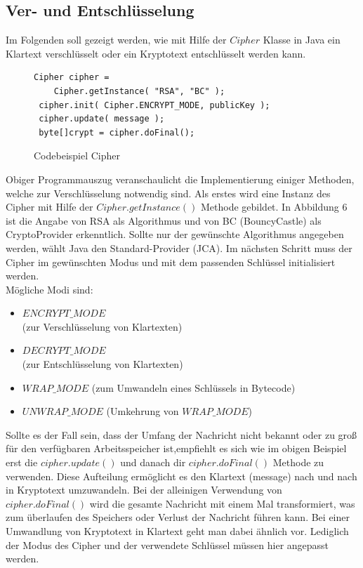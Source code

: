 \documentclass[paper=a4,11pt,german]{scrartcl} %
\begin{document}
\subsection{Ver- und Entschlüsselung}
Im Folgenden soll gezeigt werden, wie mit Hilfe der $Cipher$ Klasse in Java ein Klartext verschlüsselt oder ein Kryptotext entschlüsselt werden kann.
\begin{figure}[h]
\caption{Codebeispiel Cipher}
\begin{lstlisting}[frame=shadowbox]
 Cipher cipher = 
 	Cipher.getInstance( "RSA", "BC" );
 cipher.init( Cipher.ENCRYPT_MODE, publicKey );
 cipher.update( message );
 byte[]crypt = cipher.doFinal();
\end{lstlisting}
\label{encrypt}
\end{figure}
Obiger Programmauszug veranschaulicht die Implementierung einiger Methoden, welche zur Verschlüsselung notwendig sind. Als erstes wird eine Instanz des Cipher mit Hilfe der $Cipher.getInstance()$ Methode gebildet. In Abbildung 6 ist die Angabe von RSA als Algorithmus und von BC (BouncyCastle) als CryptoProvider erkenntlich. Sollte nur der gewünschte Algorithmus angegeben werden, wählt Java den Standard-Provider (JCA). Im nächsten Schritt muss der Cipher im gewünschten Modus und mit dem passenden Schlüssel initialisiert werden.\\
Mögliche Modi sind:
\begin{itemize}
\item $ENCRYPT\_MODE$\\(zur Verschlüsselung von Klartexten)
\item  $DECRYPT\_MODE$\\
(zur Entschlüsselung von Klartexten)
\item $WRAP\_MODE$
(zum Umwandeln eines Schlüssels in Bytecode)
\item $UNWRAP\_MODE$
(Umkehrung von $WRAP\_MODE$)
\end{itemize}
Sollte es der Fall sein, dass der Umfang der Nachricht nicht bekannt oder zu groß für den verfügbaren Arbeitsspeicher ist,empfiehlt es sich wie im obigen Beispiel erst die $cipher.update()$ und danach dir $cipher.doFinal()$ Methode zu verwenden. Diese Aufteilung ermöglicht es den Klartext (message) nach und nach in Kryptotext umzuwandeln. Bei der alleinigen Verwendung von $cipher.doFinal()$ wird die gesamte Nachricht mit einem Mal transformiert, was zum überlaufen des Speichers oder Verlust der Nachricht führen kann.
Bei einer Umwandlung von Kryptotext in Klartext geht man dabei ähnlich vor. Lediglich der Modus des Cipher und der verwendete Schlüssel müssen hier angepasst werden.  
\end{document}
